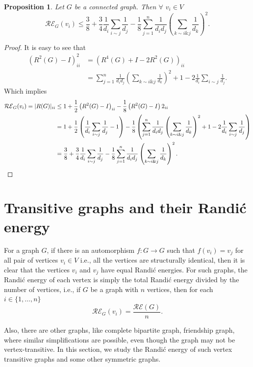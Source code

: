 \documentclass[10 pt]{article}
\newtheorem{proposition}{Proposition}[section]
\numberwithin{equation}{section}
\begin{document}
\begin{proposition}\label{Randic vertex energy upper bound 3}
Let $G$ be a connected graph. Then $\forall$ $v_i\in V$
$$\mathcal{RE}_G(v_i)\leq\frac{3}{8}+\frac{3}{4}\frac{1}{d_i}\sum\limits_{i\sim j}\frac{1}{d_j}-\frac{1}{8}\sum\limits_{j=1}^n\frac{1}{d_id_j}\left(\sum\limits_{k\sim i \& j}\frac{1}{d_k}\right)^2.$$
\end{proposition}
\begin{proof}
It is easy to see that
\begin{align*}
\left(R^2(G)-I\right)^2_{ii}&=\left(R^4(G)+I-2R^2(G)\right)_{ii}\\
&=\sum\limits_{j=1}^n\frac{1}{d_id_j}\left(\sum\limits_{k\sim i \& j}\frac{1}{d_k}\right)^2+1-2\frac{1}{d_i}\sum\limits_{i\sim j}\frac{1}{d_j}.
\end{align*}
Which implies
\begin{align*}
\mathcal{RE}_G(v_i)=|R(G)|_{ii}&\leq 1+\frac{1}{2}\left(R^2(G)-I\right)_{ii}-\frac{1}{8}\left(R^2(G)-I\right)2_{ii}\\
&=1+\frac{1}{2}\left(\frac{1}{d_i}\sum\limits_{i\sim j}\frac{1}{d_j}-1\right)-\frac{1}{8}\left(\sum\limits_{j=1}^n\frac{1}{d_id_j}\left(\sum\limits_{k\sim i \& j}\frac{1}{d_k}\right)^2+1-2\frac{1}{d_i}\sum\limits_{i\sim j}\frac{1}{d_j}\right)\\
&=\frac{3}{8}+\frac{3}{4}\frac{1}{d_i}\sum\limits_{i\sim j}\frac{1}{d_j}-\frac{1}{8}\sum\limits_{j=1}^n\frac{1}{d_id_j}\left(\sum\limits_{k\sim i \& j}\frac{1}{d_k}\right)^2.\qedhere
\end{align*}
\end{proof}

\section{Transitive graphs and their Randi\'c energy}

For a graph $G$, if there is an automorphism $f:G\rightarrow G$ such that $f(v_i)=v_j$ for all pair of vertices $v_i\in V$ i.e., all the vertices are structurally identical, then it is clear that the vertices $v_i$ and $v_j$ have equal Randi\'c energies. For such graphs, the Randi\'c energy of each vertex is simply the total Randi\'c energy divided by the number of vertices, i.e., if $G$ be a graph with $n$ vertices, then for each $i\in \{1,\ldots,n\}$
$$\mathcal{RE}_G(v_i)=\frac{\mathcal{RE}(G)}{n}.$$

Also, there are other graphs, like complete bipartite graph, friendship graph, where similar simplifications are possible, even though the graph may not be vertex-transitive. In this section, we study the Randi\'c energy of such vertex transitive graphs and some other symmetric graphs.
\end{document}
